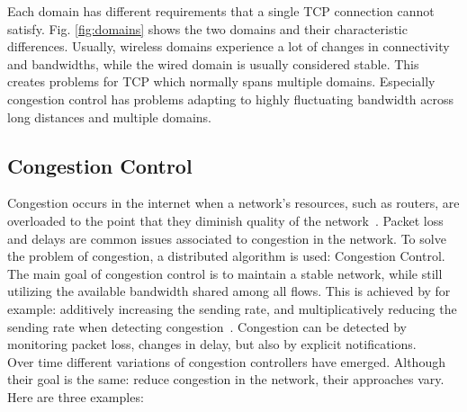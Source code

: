 \documentclass[a4paper,english, 11pt]{report}
\begin{document}
Each domain has different requirements that a single TCP connection cannot satisfy. Fig. \ref{fig:domains} shows the two domains and their characteristic differences. Usually, wireless domains experience a lot of changes in connectivity and bandwidths, while the wired domain is usually considered stable. This creates problems for TCP which normally spans multiple domains. Especially congestion control has problems adapting to highly fluctuating bandwidth across long distances and multiple domains. 

\subsection{Congestion Control}
Congestion occurs in the internet when a network's resources, such as routers, are overloaded to the point that they diminish quality of the network~\cite{rfc6077}. Packet loss and delays are common issues associated to congestion in the network. To solve the problem of congestion, a distributed algorithm is used: Congestion Control. The main goal of congestion control is to maintain a stable network, while still utilizing the available bandwidth shared among all flows. This is achieved by for example: additively increasing the sending rate, and multiplicatively reducing the sending rate when detecting congestion~\cite{welzl_congestion}. Congestion can be detected by monitoring packet loss, changes in delay, but also by explicit notifications.\\

Over time different variations of congestion controllers have emerged. Although their goal is the same: reduce congestion in the network, their approaches vary. Here are three examples:
\end{document}
